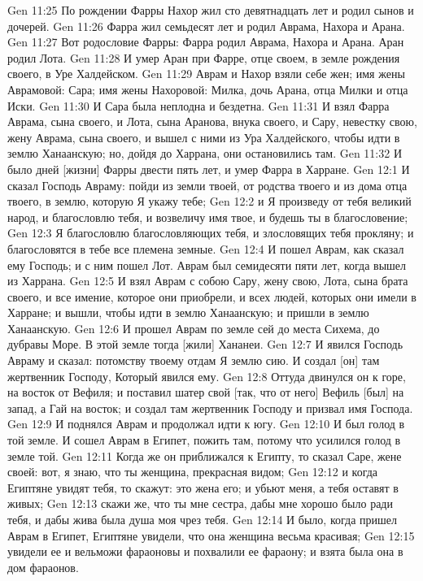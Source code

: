 Gen 11:25  По рождении Фарры Нахор жил сто девятнадцать лет и родил сынов и дочерей.
Gen 11:26  Фарра жил семьдесят лет и родил Аврама, Нахора и Арана.
Gen 11:27  Вот родословие Фарры: Фарра родил Аврама, Нахора и Арана. Аран родил Лота.
Gen 11:28  И умер Аран при Фарре, отце своем, в земле рождения своего, в Уре Халдейском.
Gen 11:29  Аврам и Нахор взяли себе жен; имя жены Аврамовой: Сара; имя жены Нахоровой: Милка, дочь Арана, отца Милки и отца Иски.
Gen 11:30  И Сара была неплодна и бездетна.
Gen 11:31  И взял Фарра Аврама, сына своего, и Лота, сына Аранова, внука своего, и Сару, невестку свою, жену Аврама, сына своего, и вышел с ними из Ура Халдейского, чтобы идти в землю Ханаанскую; но, дойдя до Харрана, они остановились там.
Gen 11:32  И было дней [жизни] Фарры двести пять лет, и умер Фарра в Харране.
Gen 12:1  И сказал Господь Авраму: пойди из земли твоей, от родства твоего и из дома отца твоего, в землю, которую Я укажу тебе;
Gen 12:2  и Я произведу от тебя великий народ, и благословлю тебя, и возвеличу имя твое, и будешь ты в благословение;
Gen 12:3  Я благословлю благословляющих тебя, и злословящих тебя прокляну; и благословятся в тебе все племена земные.
Gen 12:4  И пошел Аврам, как сказал ему Господь; и с ним пошел Лот. Аврам был семидесяти пяти лет, когда вышел из Харрана.
Gen 12:5  И взял Аврам с собою Сару, жену свою, Лота, сына брата своего, и все имение, которое они приобрели, и всех людей, которых они имели в Харране; и вышли, чтобы идти в землю Ханаанскую; и пришли в землю Ханаанскую.
Gen 12:6  И прошел Аврам по земле сей до места Сихема, до дубравы Море. В этой земле тогда [жили] Хананеи.
Gen 12:7  И явился Господь Авраму и сказал: потомству твоему отдам Я землю сию. И создал [он] там жертвенник Господу, Который явился ему.
Gen 12:8  Оттуда двинулся он к горе, на восток от Вефиля; и поставил шатер свой [так, что от него] Вефиль [был] на запад, а Гай на восток; и создал там жертвенник Господу и призвал имя Господа.
Gen 12:9  И поднялся Аврам и продолжал идти к югу.
Gen 12:10  И был голод в той земле. И сошел Аврам в Египет, пожить там, потому что усилился голод в земле той.
Gen 12:11  Когда же он приближался к Египту, то сказал Саре, жене своей: вот, я знаю, что ты женщина, прекрасная видом;
Gen 12:12  и когда Египтяне увидят тебя, то скажут: это жена его; и убьют меня, а тебя оставят в живых;
Gen 12:13  скажи же, что ты мне сестра, дабы мне хорошо было ради тебя, и дабы жива была душа моя чрез тебя.
Gen 12:14  И было, когда пришел Аврам в Египет, Египтяне увидели, что она женщина весьма красивая;
Gen 12:15  увидели ее и вельможи фараоновы и похвалили ее фараону; и взята была она в дом фараонов.
